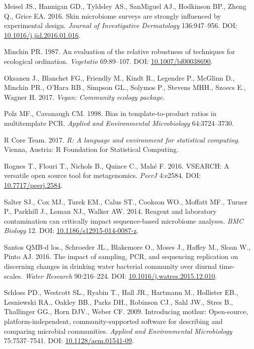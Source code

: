\documentclass[12pt,]{article}
\begin{document}
\hypertarget{ref-Meisel2016}{}
Meisel JS., Hannigan GD., Tyldsley AS., SanMiguel AJ., Hodkinson BP.,
Zheng Q., Grice EA. 2016. Skin microbiome surveys are strongly
influenced by experimental design. \emph{Journal of Investigative
Dermatology} 136:947--956. DOI:
\href{https://doi.org/10.1016/j.jid.2016.01.016}{10.1016/j.jid.2016.01.016}.

\hypertarget{ref-bc_index_Minchin1987}{}
Minchin PR. 1987. An evaluation of the relative robustness of techniques
for ecological ordination. \emph{Vegetatio} 69:89--107. DOI:
\href{https://doi.org/10.1007/bf00038690}{10.1007/bf00038690}.

\hypertarget{ref-vegan_citation}{}
Oksanen J., Blanchet FG., Friendly M., Kindt R., Legendre P., McGlinn
D., Minchin PR., O'Hara RB., Simpson GL., Solymos P., Stevens MHH.,
Szoecs E., Wagner H. 2017. \emph{Vegan: Community ecology package}.

\hypertarget{ref-polz_bias_1998}{}
Polz MF., Cavanaugh CM. 1998. Bias in template-to-product ratios in
multitemplate PCR. \emph{Applied and Environmental Microbiology}
64:3724--3730.

\hypertarget{ref-r_citation_2017}{}
R Core Team. 2017. \emph{R: A language and environment for statistical
computing}. Vienna, Austria: R Foundation for Statistical Computing.

\hypertarget{ref-vsearch_Rognes_2016}{}
Rognes T., Flouri T., Nichols B., Quince C., Mahé F. 2016. VSEARCH: A
versatile open source tool for metagenomics. \emph{PeerJ} 4:e2584. DOI:
\href{https://doi.org/10.7717/peerj.2584}{10.7717/peerj.2584}.

\hypertarget{ref-contamination_Salter2014}{}
Salter SJ., Cox MJ., Turek EM., Calus ST., Cookson WO., Moffatt MF.,
Turner P., Parkhill J., Loman NJ., Walker AW. 2014. Reagent and
laboratory contamination can critically impact sequence-based microbiome
analyses. \emph{BMC Biology} 12. DOI:
\href{https://doi.org/10.1186/s12915-014-0087-z}{10.1186/s12915-014-0087-z}.

\hypertarget{ref-BautistadelosSantos2016}{}
Santos QMB-d los., Schroeder JL., Blakemore O., Moses J., Haffey M.,
Sloan W., Pinto AJ. 2016. The impact of sampling, PCR, and sequencing
replication on discerning changes in drinking water bacterial community
over diurnal time-scales. \emph{Water Research} 90:216--224. DOI:
\href{https://doi.org/10.1016/j.watres.2015.12.010}{10.1016/j.watres.2015.12.010}.

\hypertarget{ref-mothur_schloss_2009}{}
Schloss PD., Westcott SL., Ryabin T., Hall JR., Hartmann M., Hollister
EB., Lesniewski RA., Oakley BB., Parks DH., Robinson CJ., Sahl JW.,
Stres B., Thallinger GG., Horn DJV., Weber CF. 2009. Introducing mothur:
Open-source, platform-independent, community-supported software for
describing and comparing microbial communities. \emph{Applied and
Environmental Microbiology} 75:7537--7541. DOI:
\href{https://doi.org/10.1128/aem.01541-09}{10.1128/aem.01541-09}.
\end{document}
